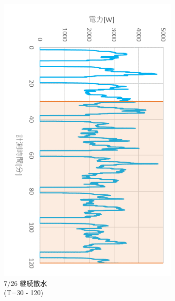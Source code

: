 \documentclass[a4j,fleqn,dvipdfmx,uplatex]{jsarticle}
\begin{document}
\begin{figure}[htb]
  \addtocounter{figure}{-1}
  \centering
  \begin{subfigure}[t]{0.32\linewidth}
    \addtocounter{subfigure}{6} %
    \centering
    \includegraphics[width=\linewidth]{img/t_p/20220726.png}
    \caption{7/26 継続散水\\(T=30 - 120)}\label{fig:g}
  \end{subfigure}
  \begin{subfigure}[t]{0.32\linewidth}
    \centering

\end{subfigure}
\end{figure}
\end{document}
